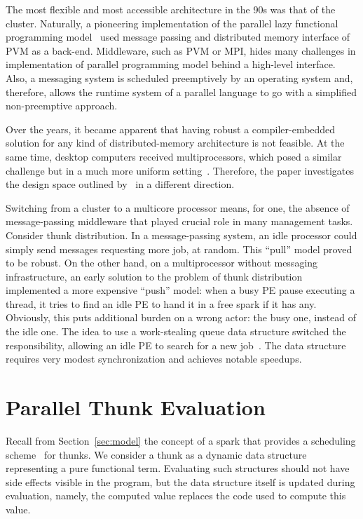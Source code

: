 \documentclass[11pt]{extarticle}
\begin{document}
The most flexible and most accessible architecture in the 90s was that of the cluster. Naturally, a pioneering implementation of the parallel lazy functional programming model~\cite{Trinder96} used message passing and distributed memory interface of PVM as a back-end. Middleware, such as PVM or MPI, hides many challenges in implementation of parallel programming model behind a high-level interface. Also, a messaging system is scheduled preemptively by an operating system and, therefore, allows the runtime system of a parallel language to go with a simplified non-preemptive approach.

Over the years, it became apparent that having robust a compiler-embedded solution for any kind of distributed-memory architecture is not feasible. At the same time, desktop computers received multiprocessors, which posed a similar challenge but in a much more uniform setting~\cite{Harris05}. Therefore, the paper investigates the design space outlined by~\cite{Trinder96} in a different direction. 

Switching from a cluster to a multicore processor means, for one, the absence of message-passing middleware that played crucial role in many management tasks. Consider thunk distribution. In a message-passing system, an idle processor could simply send messages requesting more job, at random. This ``pull'' model proved to be robust. On the other hand, on a multiprocessor without messaging infrastructure, an early solution to the problem of thunk distribution implemented a more expensive ``push'' model: when a busy PE pause executing a thread, it tries to find an idle PE to hand it in a free spark if it has any. Obviously, this puts additional burden on a wrong actor: the busy one, instead of the idle one. The idea to use a work-stealing queue data structure switched the responsibility, allowing an idle PE to search for a new job~\cite{Marlow09}. The data structure requires very modest synchronization and achieves notable speedups. 

\section{Parallel Thunk Evaluation}

Recall from Section~\ref{sec:model} the concept of a spark that provides a scheduling scheme~\cite{Trinder96} for thunks.
We consider a thunk as a dynamic data structure representing a pure functional term. Evaluating such structures should not have side effects visible in the program, but the data structure itself is updated during evaluation, namely, the computed value replaces the code used to compute this value.
\end{document}
